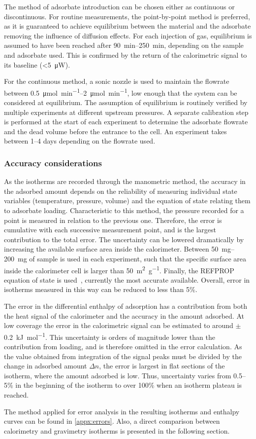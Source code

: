 The method of adsorbate introduction can be chosen either as
continuous or discontinuous. For routine measurements,
the point-by-point method is preferred, as it is guaranteed
to achieve equilibrium between the material and the adsorbate
removing the influence of diffusion effects.
For each injection of gas, equilibrium is assumed to have
been reached after \SIrange{90}{250}{\minute}, depending on the
sample and adsorbate used. This is confirmed by the return
of the calorimetric signal to its baseline (<\SI{5}{\micro\watt}).

For the continuous method, a sonic nozzle is used to 
maintain the flowrate between \SIrange{0.5}{2}{\micro\mol\per\minute},
low enough that the system can be considered at equilibrium.
The assumption of equilibrium is routinely verified by multiple
experiments at different upstream pressures.
A separate calibration step is performed at the start of each
experiment to determine the adsorbate flowrate and the dead volume
before the entrance to the cell. An experiment takes between 1--4 
days depending on the flowrate used. 

\subsubsection{Accuracy considerations}\label{calo:accuracy}

As the isotherms are recorded through the manometric method,
the accuracy in the adsorbed amount depends on the reliability
of measuring individual state variables (temperature,
pressure, volume) and the equation of state relating them 
to adsorbate loading.
Characteristic to this method, the pressure recorded for 
a point is measured in relation to the previous one. Therefore,
the error is cumulative with each successive measurement point,
and is the largest contribution to the total error. The 
uncertainty can be lowered dramatically by increasing 
the available surface area inside the calorimeter.
Between \SIrange{50}{200}{\milli\gram}
of sample is used in each experiment, such that the specific
surface area inside the calorimeter cell is larger than
\SI{50}{\metre^2\per\gram}. Finally, the REFPROP equation
of state is used~\cite{lemmonNISTReferenceFluid1989}, 
currently the most accurate available.
Overall, error in isotherms measured in this way can be 
reduced to less than 5\%.

The error in the differential enthalpy of adsorption has a
contribution from both the heat signal of the calorimeter 
and the accuracy in the amount adsorbed.
At low coverage the error in the calorimetric signal can be
estimated to around \( \pm \) \SI{0.2} {\kilo\joule\per\mol}.
This uncertainty is orders of magnitude lower than the contribution
from loading, and is therefore omitted in the error calculation.
As the value obtained from integration of the signal peaks
must be divided by the change in adsorbed amount \(\Delta n\),
the error is largest in flat sections of the isotherm, where 
the amount adsorbed is low. Thus, uncertainty varies from 
0.5--5\% in the beginning of the isotherm to over 100\% when
an isotherm plateau is reached.

The method applied for error analysis in the resulting isotherms and
enthalpy curves can be found in \autoref{appx:errors}. 
Also, a direct comparison
between calorimetry and gravimetry isotherms is presented in the 
following section.